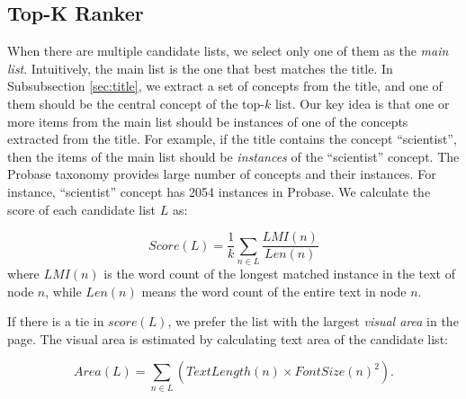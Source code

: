 \subsection{Top-K Ranker}
\label{sec:ranker}

When there are multiple candidate lists,
we select only one of them as the {\em main list}.
Intuitively, the main list is the one that best matches the title.
In Subsubsection \ref{sec:title}, we extract a set of concepts from
the title, and one of them should be the central concept of the top-$k$ list.
Our key idea is that one or more items from the main list should be instances
of one of the concepts extracted from the title. For example, if the title
contains the concept ``scientist'', then the items of the main list should
be {\em instances} of the ``scientist'' concept. The Probase taxonomy provides
large number of concepts and their instances. 
For instance, ``scientist'' concept has 2054 instances in Probase.
We calculate the score of each candidate list $L$ as:

\[Score(L)= \frac{1}{k} \sum_{n \in L} \frac{LMI(n)}{Len(n)}\]
where $LMI(n)$ is the word count of the longest matched
instance in the text of node $n$,
while $Len(n)$ means the word count of the entire text in node $n$.

If there is a tie in $score(L)$, we prefer the list with the largest
{\em visual area} in the page.
The visual area is estimated by calculating text area
of the candidate list:

\[Area(L)= \sum_{n \in L} (TextLength(n)\times FontSize(n)^2).\]

